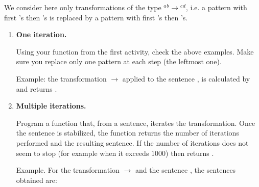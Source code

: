 \documentclass[11pt,class=report,crop=false]{standalone}
\begin{document}

\begin{activite}


We consider here only transformations of the type \rzero$^a$\run$^b$$\rightarrow$\run$^c$\rzero$^d$, i.e. a pattern with first \rzero's then \run's is replaced by a pattern with first \run's then \rzero's.



\begin{enumerate}
  \item \textbf{One iteration.}
  
   Using your  function from the first activity, check the above examples. Make sure you replace only one pattern at each step (the leftmost one).
  
  Example: the transformation \rzero\run{} $\rightarrow$ \run\rzero{} applied to the sentence \run\rzero\run, is calculated by  and returns .
   
  \item \textbf{Multiple iterations.}
  
  
  Program a function  that, from a sentence, iterates the transformation. Once the sentence is stabilized, the function returns the number of iterations performed and the resulting sentence. If the number of iterations does not seem to stop (for example when it exceeds $1000$) then returns .
  
  Example. For the transformation \rzero\rzero\run\run{} $\rightarrow$ \run\run\rzero\rzero{} and the sentence \rzero\rzero\rzero\rzero\run\run\rzero\run{}, the sentences obtained are: 
  
{\small
{}
}



\medskip


\end{enumerate}
\end{activite}
\end{document}
